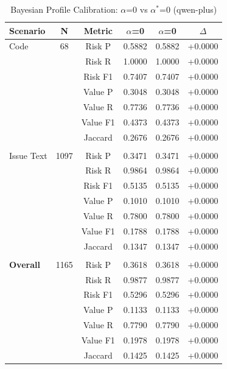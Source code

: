 \begin{table}[htbp]
\centering
\caption{Bayesian Profile Calibration: $\alpha$=0 vs $\alpha^*$=0 (qwen-plus)}
\label{tab:exp3_bayesian}
\begin{tabular}{lccccc}
\toprule
\textbf{Scenario} & \textbf{N} & \textbf{Metric} & \textbf{$\alpha$=0} & \textbf{$\alpha$=0} & \textbf{$\Delta$} \\
\midrule
Code & 68 & Risk P & 0.5882 & 0.5882 & +0.0000 \\
 &  & Risk R & 1.0000 & 1.0000 & +0.0000 \\
 &  & Risk F1 & 0.7407 & 0.7407 & +0.0000 \\
 &  & Value P & 0.3048 & 0.3048 & +0.0000 \\
 &  & Value R & 0.7736 & 0.7736 & +0.0000 \\
 &  & Value F1 & 0.4373 & 0.4373 & +0.0000 \\
 &  & Jaccard & 0.2676 & 0.2676 & +0.0000 \\
\midrule &  &  &  &  &  \\
Issue Text & 1097 & Risk P & 0.3471 & 0.3471 & +0.0000 \\
 &  & Risk R & 0.9864 & 0.9864 & +0.0000 \\
 &  & Risk F1 & 0.5135 & 0.5135 & +0.0000 \\
 &  & Value P & 0.1010 & 0.1010 & +0.0000 \\
 &  & Value R & 0.7800 & 0.7800 & +0.0000 \\
 &  & Value F1 & 0.1788 & 0.1788 & +0.0000 \\
 &  & Jaccard & 0.1347 & 0.1347 & +0.0000 \\
\midrule &  &  &  &  &  \\
\textbf{Overall} & 1165 & Risk P & 0.3618 & 0.3618 & +0.0000 \\
 &  & Risk R & 0.9877 & 0.9877 & +0.0000 \\
 &  & Risk F1 & 0.5296 & 0.5296 & +0.0000 \\
 &  & Value P & 0.1133 & 0.1133 & +0.0000 \\
 &  & Value R & 0.7790 & 0.7790 & +0.0000 \\
 &  & Value F1 & 0.1978 & 0.1978 & +0.0000 \\
 &  & Jaccard & 0.1425 & 0.1425 & +0.0000 \\
\bottomrule
\end{tabular}
\end{table}